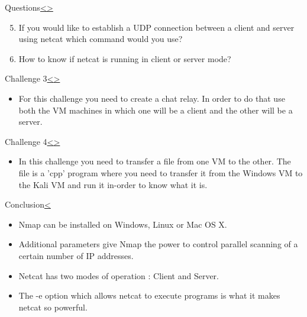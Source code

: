 \documentclass[12pt]{extarticle}
\newenvironment{instructionblock}{\Large\bgroup}{\egroup}
\begin{document}
\pagebreak
\begin{slide}{Questions}{\hyperref[slide 18]{\textless}\hyperref[slide 20]{\textgreater}}
	\vskip 5pt
	\begin{instructionblock}
	\begin{enumerate}
		\setcounter{enumi}{4}
		\item If you would like to establish a UDP connection between a client and server using netcat which command would you use?
		\item How to know if netcat is running in client or server mode?
	\end{enumerate}
	
	\end{instructionblock}
\end{slide}

\pagebreak
\begin{slide}{Challenge 3}{\hyperref[slide 19]{\textless}\hyperref[slide 21]{\textgreater}}
	\begin{instructionblock}
		\begin{itemize}
			\item For this challenge you need to create a chat relay. In order to do that use both the VM machines in which one will be a client and the other will be a server. 
		\end{itemize}
	\end{instructionblock}
\end{slide}

\pagebreak
\begin{slide}{Challenge 4}{\hyperref[slide 20]{\textless}\hyperref[slide 22]{\textgreater}}
	\begin{instructionblock}
		\begin{itemize}
			\item In this challenge you need to transfer a file from one VM to the other. The file is a 'cpp' program where you need to transfer it from the Windows VM to the Kali VM and run it in-order to know what it is.
		\end{itemize}
	\end{instructionblock}
\end{slide}
\pagebreak
\begin{slide}{Conclusion}{\hyperref[slide 21]{\textless}}
\begin{instructionblock}
\begin{itemize}
\item Nmap can be installed on Windows, Linux or Mac OS X.
\item Additional parameters give Nmap the power to control parallel scanning of a certain number of IP addresses.
\item Netcat has two modes of operation : Client and Server.
\item The -e option which allows netcat to execute programs is what it makes netcat so powerful.
\end{itemize}
\end{instructionblock}
\end{slide}
\vfill
\end{document}
